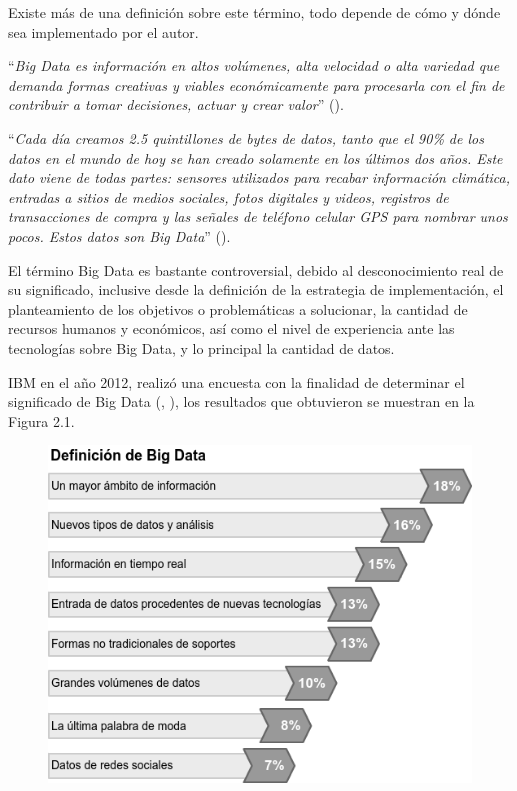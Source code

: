 Existe más de una definición sobre este término, todo depende de cómo y dónde sea implementado por el autor.

“\textit{Big Data es información en altos volúmenes, alta velocidad o alta variedad que demanda formas creativas y viables económicamente para procesarla con el fin de contribuir a tomar decisiones, actuar y crear valor}” (\citeauthor{garner}).

“\textit{Cada día creamos 2.5 quintillones de bytes de datos, tanto que el 90\% de los datos en el mundo de hoy se han creado solamente en los últimos dos años. Este dato viene de todas partes: sensores utilizados para recabar información climática, entradas a sitios de medios sociales, fotos digitales y videos, registros de transacciones de compra y las señales de teléfono celular GPS para nombrar unos pocos. Estos datos son Big Data}” (\citeauthor{IBM}).

El término Big Data es bastante controversial, debido al desconocimiento real de su significado, inclusive desde la definición de la estrategia de implementación, el planteamiento de los objetivos o problemáticas a solucionar, la cantidad de recursos humanos y económicos, así como el nivel de experiencia ante las tecnologías sobre Big Data, y lo principal la cantidad de datos.

IBM en el año 2012, realizó una encuesta con la finalidad de determinar el significado de Big Data (\citeauthor{artBigData}, \citeyear{artBigData}), los resultados que obtuvieron se muestran en la Figura 2.1.

\begin{figure}[H]
	\centering
	\includegraphics[height=0.3\textheight]{fig01/bigdata_enc}
	\label{fig:RHP02}
\end{figure}

